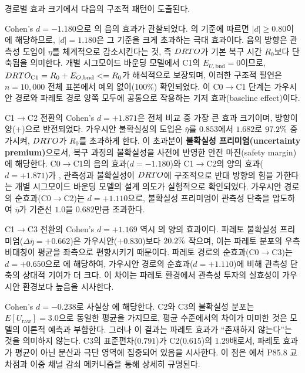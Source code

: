\noindent
경로별 효과 크기에서 다음의 구조적 패턴이 도출된다.

Cohen's $d = -1.180$으로 의 음의 효과가 관찰되었다.
\citet{cohen1988power}의 기준에 따르면 $|d| \geq 0.80$이 에
해당하므로, $|d| = 1.180$은 그 기준을 크게 초과하는 극대 효과이다.
음의 방향은 관측성 도입이 $\eta$를 체계적으로 감소시킨다는 것,
즉 $\DRTO$가 기본 복구 시간 $R_0$보다 단축됨을 의미한다.
개별 시그모이드 바운딩 모델에서 C1의 $E_{U,\text{bnd}} = 0$이므로,
$\DRTO_{\text{C1}} = R_0 + E_{O,\text{bnd}} \leq R_0$가 해석적으로 보장되며,
이러한 구조적 필연은 $n = 10{,}000$ 전체 표본에서 예외 없이(100\%) 확인되었다.
이 C0$\to$C1 단계는 가우시안 경로와 파레토 경로 양쪽 모두에 공통으로 작용하는
기저 효과(baseline effect)이다.

C1$\to$C2 전환의 Cohen's $d = +1.871$은 전체 비교 중 가장 큰 효과 크기이며,
방향이 양(+)으로 반전되었다.
가우시안 불확실성의 도입은 $\bar{\eta}$를 $0.853$에서 $1.682$로
$\erf{97.2}{97.3}\%$ 증가시켜, $\DRTO$가 $R_0$를 초과하게 한다.
이 초과분이 \textbf{불확실성 프리미엄(uncertainty premium)}으로서,
복구 과정의 불확실성을 사전에 반영한 안전 마진(safety margin)에 해당한다.
C0$\to$C1의 음의 효과($d = -1.180$)와 C1$\to$C2의 양의 효과($d = +1.871$)가
, 관측성과 불확실성이 $\DRTO$에 구조적으로 반대 방향의
힘을 가한다는 개별 시그모이드 바운딩 모델의 설계 의도가 실험적으로 확인되었다.
가우시안 경로의 순효과(C0$\to$C2)는 $d = +1.110$으로, 불확실성 프리미엄이
관측성 단축을 압도하여 $\bar{\eta}$가 기준선 $1.0$을 $0.682$만큼 초과한다.

C1$\to$C3 전환의 Cohen's $d = +1.169$ 역시 의 양의 효과이다.
파레토 불확실성 프리미엄($\Delta\bar{\eta} = +0.662$)은 가우시안($+0.830$)보다
$\erf{20.2}{20.3}\%$ 작으며, 이는 파레토 분포의 우측 비대칭이 평균을 좌측으로 편향시키기
때문이다. 파레토 경로의 순효과(C0$\to$C3)는 $d = +0.650$으로
에 해당하여, 가우시안 경로의 순효과($d = +1.110$)에 비해
관측성 단축의 상대적 기여가 더 크다. 이 차이는 파레토 환경에서
관측성 투자의 실효성이 가우시안 환경보다 높음을 시사한다.

Cohen's $d = -0.238$로 사실상 에 해당한다.
C2와 C3의 불확실성 분포는 $E[U_{\text{raw}}] = 3.0$으로 동일한 평균을
가지므로, 평균 수준에서의 차이가 미미한 것은 모델의 이론적 예측과 부합한다.
그러나 이 결과는 파레토 효과가 ``존재하지 않는다''는 것을 의미하지 않는다.
C3의 표준편차($0.791$)가 C2($0.615$)의 $1.29$배로서, 파레토 효과가
평균이 아닌 분산과 극단 영역에 집중되어 있음을 시사한다.
이 점은 에서 P85.8 교차점과
이중 채널 감쇠 메커니즘을 통해 상세히 규명된다.

